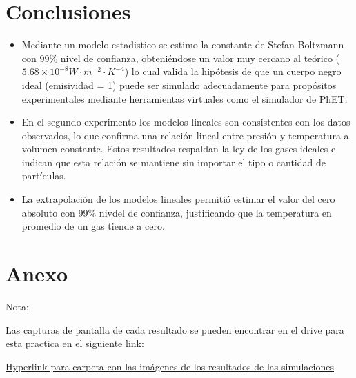 \documentclass[12pt,a4paper]{config/myConfig}
\begin{document}




\section{Conclusiones}
\label{sec:CONCLUSIONES}

\begin{itemize}
    \item Mediante un modelo estadistico se  estimo la constante de Stefan-Boltzmann con 99\% nivel de confianza, obteniéndose un valor muy cercano al teórico ($5.68\times 10^{-8} W\cdot m^{-2} \cdot K^{-4}$) lo cual valida la hipótesis de que un cuerpo negro ideal (emisividad = 1) puede ser simulado adecuadamente para propósitos experimentales mediante herramientas virtuales como el simulador de PhET. 
    \item En el segundo experimento los modelos lineales son consistentes con los datos observados, lo que confirma una relación lineal entre presión y temperatura a volumen constante. Estos resultados respaldan la ley de los gases ideales e indican que esta relación se mantiene sin importar el tipo o cantidad de partículas. 
    \item La extrapolación de los modelos lineales permitió estimar el valor del cero absoluto con 99\% nivdel de confianza, justificando que la temperatura en promedio de un gas tiende a cero. 
\end{itemize}














\footnotesize
\printbibliography
\normalsize

\section*{Anexo}
\label{sec:Anexo}

Nota:

Las capturas de pantalla de cada resultado se pueden encontrar en el drive para esta practica en el siguiente link:

\href{https://uvggt-my.sharepoint.com/:f:/g/personal/ram23062_uvg_edu_gt/EsZGHnD-QNxInH9tE-_vLxMBFMls6SJ-wshJfEF_8PD1Sw?e=mRbjYx}{Hyperlink para carpeta con las imágenes de los resultados de las simulaciones}


\end{document}
